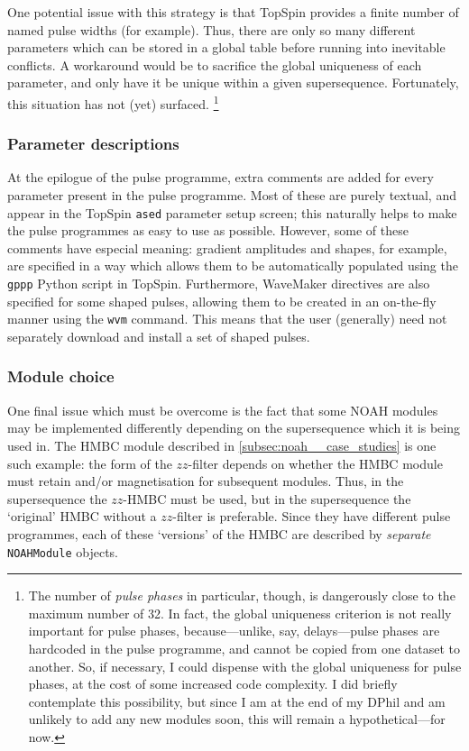 One potential issue with this strategy is that TopSpin provides a finite number of named pulse widths (for example).
Thus, there are only so many different parameters which can be stored in a global table before running into inevitable conflicts.
A workaround would be to sacrifice the global uniqueness of each parameter, and only have it be unique within a given supersequence.
Fortunately, this situation has not (yet) surfaced.%
\footnote{The number of \textit{pulse phases} in particular, though, is dangerously close to the maximum number of 32. In fact, the global uniqueness criterion is not really important for pulse phases, because---unlike, say, delays---pulse phases are hardcoded in the pulse programme, and cannot be copied from one dataset to another. So, if necessary, I could dispense with the global uniqueness for pulse phases, at the cost of some increased code complexity. I did briefly contemplate this possibility, but since I am at the end of my DPhil and am unlikely to add any new modules soon, this will remain a hypothetical---for now.}


\subsubsection{Parameter descriptions}

At the epilogue of the pulse programme, extra comments are added for every parameter present in the pulse programme.
Most of these are purely textual, and appear in the TopSpin \texttt{ased} parameter setup screen; this naturally helps to make the pulse programmes as easy to use as possible.
However, some of these comments have especial meaning: gradient amplitudes and shapes, for example, are specified in a way which allows them to be automatically populated using the \texttt{gppp} Python script in TopSpin.
Furthermore, WaveMaker directives are also specified for some shaped pulses, allowing them to be created in an on-the-fly manner using the \texttt{wvm} command.
This means that the user (generally) need not separately download and install a set of shaped pulses.

\subsubsection{Module choice}

One final issue which must be overcome is the fact that some NOAH modules may be implemented differently depending on the supersequence which it is being used in.
The HMBC module described in \cref{subsec:noah__case_studies} is one such example: the form of the $zz$-filter depends on whether the HMBC module must retain  and/or  magnetisation for subsequent modules.
Thus, in the  supersequence the $zz$-HMBC must be used, but in the  supersequence the `original' HMBC without a $zz$-filter is preferable.
Since they have different pulse programmes, each of these `versions' of the HMBC are described by \textit{separate} \texttt{NOAHModule} objects.

